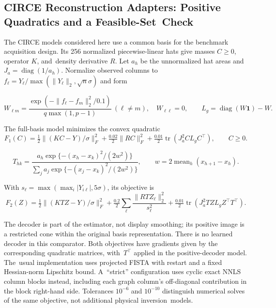 \documentclass[mathematics,article,accept,moreauthors]{Definitions/mdpi}
\newcommand{\one}{\mathbf{1}}
\newcommand{\diag}{\operatorname{diag}}
\newcommand{\tr}{\operatorname{tr}}
\begin{document}
\subsection{CIRCE Reconstruction Adapters: Positive Quadratics and a Feasible-Set~Check}\label{app:circe}
The CIRCE models considered here use a common basis for the benchmark acquisition design. Its 256 normalized piecewise-linear hats give masses $C\geq0$, operator $K$, and~density derivative $R$. Let $a_h$ be the unnormalized hat areas and $J_a=\diag(1/a_h)$. Normalize observed columns to $f_\ell=Y_\ell/\max(\|Y_\ell\|_2,\sqrt n\sigma)$ and form

\begin{equation}\label{eq:circegraph}
 W_{\ell m}=\frac{\exp(-\|f_\ell-f_m\|_2^2/0.1)}{q\max(1,p-1)}\ (\ell\ne m),
 \quad W_{\ell\ell}=0,\qquad L_g=\diag(W\one)-W.
\end{equation}

The full-basis model minimizes the convex quadratic
\begin{equation}\label{eq:circeone}
 F_1(C)=\tfrac12\|(KC-Y)/\sigma\|_F^2
       +\tfrac{0.02}{2}\|RC\|_F^2
       +\tfrac{0.01}{2}\tr(J_a^2 C L_g C^\top),\qquad C\geq0.
\end{equation}

\begin{equation}\label{eq:circedecoder}
 T_{hk}=\frac{a_h\exp\{-(x_h-x_k)^2/(2w^2)\}}
 {\sum_j a_j\exp\{-(x_j-x_k)^2/(2w^2)\}},\qquad
 w=2\operatorname{mean}_h(x_{h+1}-x_h).
\end{equation}

With $s_\ell=\max(\max_i|Y_{i\ell}|,5\sigma)$, its objective is
\begin{equation}\label{eq:circetwo}
 F_2(Z)=\tfrac12\|(KTZ-Y)/\sigma\|_F^2
       +\tfrac{0.2}{2}\sum_\ell\frac{\|RTZ_\ell\|_2^2}{s_\ell^2}
       +\tfrac{0.01}{2}\tr(J_a^2TZL_gZ^\top T^\top).
\end{equation}

The decoder is part of the estimator, not display smoothing; its positive image is a restricted cone within the original basis representation. There is no learned decoder in this comparator. Both objectives have gradients given by the corresponding quadratic matrices, with~$T^\top$ applied in the positive-decoder model. The~usual implementation uses projected FISTA with restart and a fixed Hessian-norm Lipschitz bound. A~``strict'' configuration uses cyclic exact NNLS column blocks instead, including each graph column's off-diagonal contribution in the block right-hand side. Tolerances $10^{-6}$ and $10^{-10}$ distinguish numerical solves of the same objective, not additional physical inversion~models.
\end{document}
